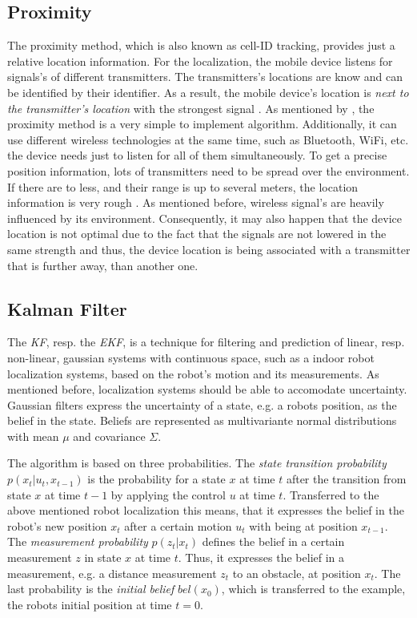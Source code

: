 \subsection{Proximity} The proximity method, which is also known as cell-ID tracking, provides just a relative location information. For the localization, the mobile device listens for signals's of different transmitters. The transmitters's locations are know and can be identified by their identifier. As a result, the mobile device's location is \emph{next to the transmitter's location} with the strongest signal \citep{IEEE:survey_wireless_indoor_pos, wang:bt_pos}. As mentioned by \citet{IEEE:survey_wireless_indoor_pos}, the proximity method is a very simple to implement algorithm. Additionally, it can use different wireless technologies at the same time, such as Bluetooth, WiFi, etc.\, the device needs just to listen for all of them simultaneously. To get a precise position information, lots of transmitters need to be spread over the environment. If there are to less, and their range is up to several meters, the location information is very rough \citep{kotanen:exp_local_pos_bt}. As mentioned before, wireless signal's are heavily influenced by its environment. Consequently, it may also happen that the device location is not optimal due to the fact that the signals are not lowered in the same strength and thus, the device location is being associated with a transmitter that is further away, than another one.

\subsection{Kalman Filter} The \emph{\ac{KF}}, resp. the \emph{\ac{EKF}}, is a technique for filtering and prediction of linear, resp. non-linear, gaussian systems with continuous space, such as a indoor robot localization systems, based on the robot's motion and its measurements. As mentioned before, localization systems should be able to accomodate uncertainty. Gaussian filters express the uncertainty of a state, e.g. a robots position, as the belief in the state. Beliefs are represented as multivariante normal distributions with mean $\mu$ and covariance $\Sigma$.

The algorithm is based on three probabilities. The \emph{state transition probability} $p(x_t | u_t , x_{t-1})$ is the probability for a state $x$ at time $t$ after the transition from state $x$ at time $t-1$ by applying the control $u$ at time $t$. Transferred to the above mentioned robot localization this means, that it expresses the belief in the robot's new position $x_t$ after a certain motion $u_t$ with being at position $x_{t-1}$. The \emph{measurement probability} $p(z_t|x_t)$ defines the belief in a certain measurement $z$ in state $x$ at time $t$. Thus, it expresses the belief in a measurement, e.g. a distance measurement $z_t$ to an obstacle, at position $x_t$. The last probability is the \emph{initial belief} $bel(x_0)$, which is transferred to the example, the robots initial position at time $t = 0$.

